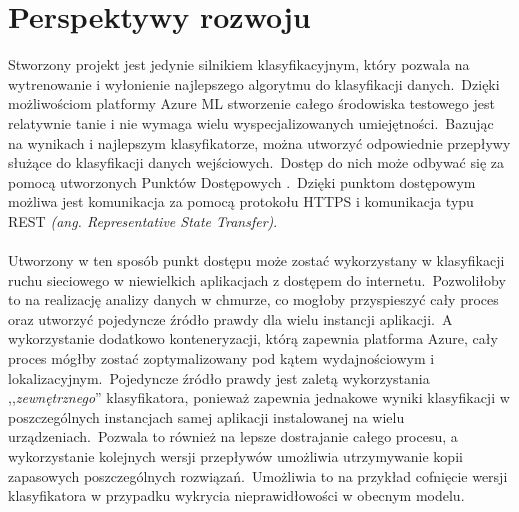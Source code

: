 \chapter{Perspektywy rozwoju}
Stworzony projekt jest jedynie silnikiem klasyfikacyjnym, który pozwala na wytrenowanie i wyłonienie najlepszego algorytmu do klasyfikacji danych.\ Dzięki możliwościom platformy Azure ML stworzenie całego środowiska testowego jest relatywnie tanie i nie wymaga wielu wyspecjalizowanych umiejętności.\ Bazując na wynikach i najlepszym klasyfikatorze, można utworzyć odpowiednie przepływy służące do klasyfikacji danych wejściowych.\ Dostęp do nich może odbywać się za pomocą utworzonych Punktów Dostępowych .\ Dzięki punktom dostępowym możliwa jest komunikacja za pomocą protokołu HTTPS  i komunikacja typu REST \textit{(ang. Representative State Transfer)}.
\\ \\
Utworzony w ten sposób punkt dostępu może zostać wykorzystany w klasyfikacji ruchu sieciowego w niewielkich aplikacjach z dostępem do internetu.\ Pozwoliłoby to na realizację analizy danych w chmurze, co mogłoby przyspieszyć cały proces oraz utworzyć pojedyncze źródło prawdy dla wielu instancji aplikacji.\ A wykorzystanie dodatkowo konteneryzacji, którą zapewnia platforma Azure, cały proces mógłby zostać zoptymalizowany pod kątem wydajnościowym i lokalizacyjnym.\ Pojedyncze źródło prawdy jest zaletą wykorzystania ,,\textit{zewnętrznego}'' klasyfikatora, ponieważ zapewnia jednakowe wyniki klasyfikacji w poszczególnych instancjach samej aplikacji instalowanej na wielu urządzeniach.\ Pozwala to również na lepsze dostrajanie całego procesu, a wykorzystanie kolejnych wersji przepływów umożliwia utrzymywanie kopii zapasowych poszczególnych rozwiązań.\ Umożliwia to na przykład cofnięcie wersji klasyfikatora w przypadku wykrycia nieprawidłowości w obecnym modelu.
